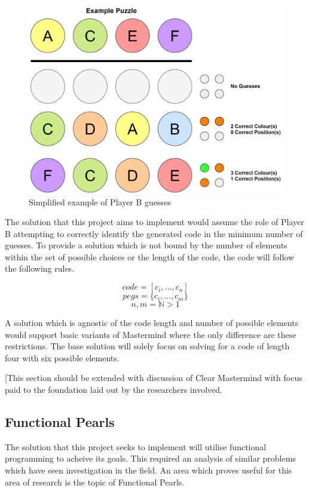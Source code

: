 \documentclass[12pt]{article}  %
\theoremstyle{definition}
\theoremstyle{remark}
\begin{document}
\begin{figure}[H]
\centering
\includegraphics[scale=0.75]{guesses}
\caption{ Simplified example of Player B guesses}
\end{figure}

\par The solution that this project aims to implement would assume the role of Player B attempting to correctly identify the generated code in the minimum number of guesses.
To provide a solution which is not bound by the number of elements within the set of possible choices or the length of the code, the code will follow the following rules.

\[ code = [c_i, ... ,c_n]\]
\[pegs = \{c_i, ... , c_m\}\]
\[ n,m = \mathbb{N} > 1\]

A solution which is agnostic of the code length and number of possible elements would support basic variants of Mastermind where the only difference are these restrictions. The base solution will solely focus on solving for a code of length four with six possible elements.

[This section should be extended with discussion of Clear Mastermind with focus paid to the foundation laid out by the researchers involved.

\subsection {Functional Pearls}
The solution that this project seeks to implement will utilise functional programming to acheive its goals. This required an analysis of similar problems which have seen investigation in the field. An area which proves useful for this area of research is the topic of Functional Pearls.
\end{document}
